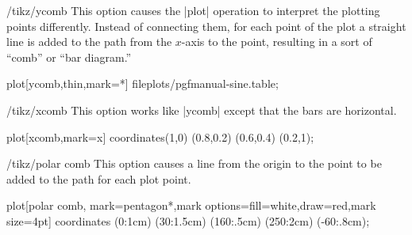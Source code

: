 \begin{key}{/tikz/ycomb}
  This option causes the |plot| operation to interpret the plotting
  points differently. Instead of connecting them, for each point of
  the plot a straight line is added to the path from the $x$-axis to the point,
  resulting in a sort of ``comb'' or ``bar diagram.''

\begin{codeexample}[]
\tikz{} plot[ycomb,thin,mark=*] file{plots/pgfmanual-sine.table};
\end{codeexample}

\begin{codeexample}[]
\end{codeexample}
\end{key}


\begin{key}{/tikz/xcomb}
  This option works like |ycomb| except that the bars are horizontal. 

\begin{codeexample}[]
\tikz \draw plot[xcomb,mark=x] coordinates{(1,0) (0.8,0.2) (0.6,0.4) (0.2,1)};
\end{codeexample}
\end{key}


\begin{key}{/tikz/polar comb}
  This option causes a line from the origin to the point to be added
  to the path for each plot point.

\begin{codeexample}[]
\tikz \draw plot[polar comb,
     mark=pentagon*,mark options={fill=white,draw=red},mark size=4pt]
   coordinates {(0:1cm) (30:1.5cm) (160:.5cm) (250:2cm) (-60:.8cm)};
\end{codeexample}
\end{key}

